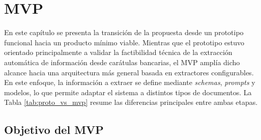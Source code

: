 \chapter{MVP}\label{chap:mvp}

En este capítulo se presenta la transición de la propuesta desde un prototipo funcional hacia un producto mínimo viable. Mientras que el prototipo estuvo orientado principalmente a validar la factibilidad técnica de la extracción automática de información desde carátulas bancarias, el MVP amplía dicho alcance hacia una arquitectura más general basada en extractores configurables. En este enfoque, la información a extraer se define mediante \textit{schemas}, \textit{prompts} y modelos, lo que permite adaptar el sistema a distintos tipos de documentos. La Tabla \ref{tab:proto_vs_mvp} resume las diferencias principales entre ambas etapas.

\begin{table}[H]
\centering
{}
\caption{Comparación entre prototipo y MVP}
\label{tab:proto_vs_mvp}
\end{table}


\section{Objetivo del MVP}

